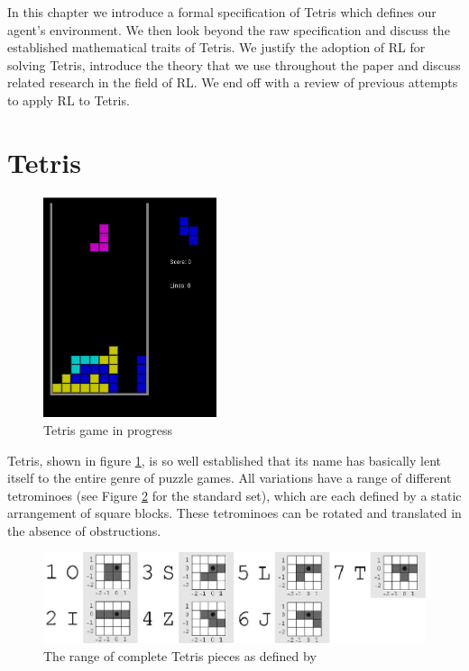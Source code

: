 \documentclass{rucsthesis}
\begin{document}
In this chapter we introduce a formal specification of Tetris which defines our agent's environment. We then look beyond the raw specification and discuss the established mathematical traits of Tetris. We justify the adoption of RL for solving Tetris, introduce the theory that we use throughout the paper and discuss related research in the field of RL. We end off with a review of previous attempts to apply RL to Tetris.

\section{Tetris}

\begin{figure}[h]
\centering%
\includegraphics[width=2in]{tetgame.jpg}
\caption{Tetris game in progress}
\label{fig:tetgame}
\end{figure}

Tetris, shown in figure \ref{fig:tetgame}, is so well established that its name has basically lent itself to the entire genre of puzzle games. All variations have a range of different tetrominoes (see Figure \ref{fig:pieces} for the standard set), which are each defined by a static arrangement of square blocks. These tetrominoes can be rotated and translated in the absence of obstructions. 

\begin{figure}[h]
\centering
\includegraphics[width=\textwidth]{tetrisblocks.jpg}
\caption{The range of complete Tetris pieces as defined by \cite{tetstand}}
\label{fig:pieces}
\end{figure}
 
\end{document}
